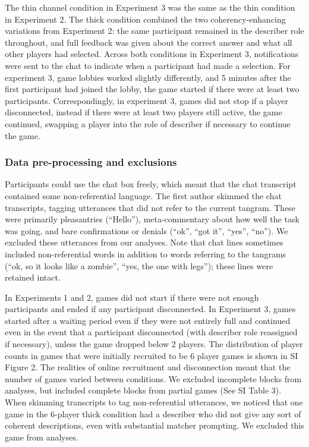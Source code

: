 \documentclass[
  english,
]{article}
\begin{document}
The thin channel condition in Experiment 3 was the same as the thin condition in Experiment 2.
The thick condition combined the two coherency-enhancing variations from Experiment 2: the same participant remained in the describer role throughout, and full feedback was given about the correct answer and what all other players had selected.
Across both conditions in Experiment 3, notifications were sent to the chat to indicate when a participant had made a selection.
For experiment 3, game lobbies worked slightly differently, and 5 minutes after the first participant had joined the lobby, the game started if there were at least two participants. Correspondingly, in experiment 3, games did not stop if a player disconnected, instead if there were at least two players still active, the game continued, swapping a player into the role of describer if necessary to continue the game.

\subsubsection{Data pre-processing and exclusions}\label{data-pre-processing-and-exclusions}

Participants could use the chat box freely, which meant that the chat transcript contained some non-referential language. The first author skimmed the chat transcripts, tagging utterances that did not refer to the current tangram. These were primarily pleasantries (``Hello''), meta-commentary about how well the task was going, and bare confirmations or denials (``ok'', ``got it'', ``yes'', ``no''). We excluded these utterances from our analyses. Note that chat lines sometimes included non-referential words in addition to words referring to the tangrams (``ok, so it looks like a zombie'', ``yes, the one with legs''); these lines were retained intact.

In Experiments 1 and 2, games did not start if there were not enough participants and ended if any participant disconnected.
In Experiment 3, games started after a waiting period even if they were not entirely full and continued even in the event that a participant disconnected (with describer role reassigned if necessary), unless the game dropped below 2 players.
The distribution of player counts in games that were initially recruited to be 6 player games is shown in SI Figure 2.
The realities of online recruitment and disconnection meant that the number of games varied between conditions.
We excluded incomplete blocks from analyses, but included complete blocks from partial games (See SI Table 3).
When skimming transcripts to tag non-referential utterances, we noticed that one game in the 6-player thick condition had a describer who did not give any sort of coherent descriptions, even with substantial matcher prompting. We excluded this game from analyses.
\end{document}
